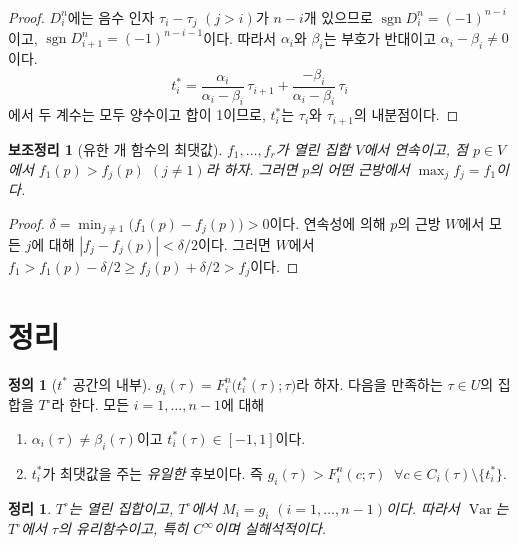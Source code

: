 \documentclass[11pt,a4paper]{article}
\newtheorem{theorem}{정리}
\newtheorem{lemma}{보조정리}
\theoremstyle{definition}
\newtheorem{definition}{정의}
\theoremstyle{remark}
\newcommand{\Var}{\operatorname{Var}}
\begin{document}
\begin{proof}
$D_i^n$에는 음수 인자 $\tau_i-\tau_j$ $(j>i)$가 $n-i$개 있으므로 $\operatorname{sgn}D_i^n=(-1)^{n-i}$이고, $\operatorname{sgn}D_{i+1}^n=(-1)^{n-i-1}$이다.
따라서 $\alpha_i$와 $\beta_i$는 부호가 반대이고 $\alpha_i-\beta_i\ne0$이다.
\[
t^*_i=\frac{\alpha_i}{\alpha_i-\beta_i}\,\tau_{i+1}+\frac{-\beta_i}{\alpha_i-\beta_i}\,\tau_i
\]
에서 두 계수는 모두 양수이고 합이 1이므로, $t^*_i$는 $\tau_i$와 $\tau_{i+1}$의 내분점이다.
\end{proof}

\begin{lemma}[유한 개 함수의 최댓값]\label{lem:max}
$f_1,\dots,f_r$가 열린 집합 $V$에서 연속이고, 점 $p\in V$에서 $f_1(p)>f_j(p)$ $(j\ne1)$라 하자.
그러면 $p$의 어떤 근방에서 $\max_j f_j=f_1$이다.
\end{lemma}

\begin{proof}
$\delta=\min_{j\ne1}\bigl(f_1(p)-f_j(p)\bigr)>0$이다.
연속성에 의해 $p$의 근방 $W$에서 모든 $j$에 대해 $|f_j-f_j(p)|<\delta/2$이다.
그러면 $W$에서 $f_1>f_1(p)-\delta/2\ge f_j(p)+\delta/2>f_j$이다.
\end{proof}

\section{정리}

\begin{definition}[$t^*$ 공간의 내부]
$g_i(\tau)=F_i^n\bigl(t^*_i(\tau);\tau\bigr)$라 하자. 다음을 만족하는 $\tau\in U$의 집합을 $T^\circ$라 한다.
모든 $i=1,\dots,n-1$에 대해
\begin{enumerate}[label=(\roman*)]
\item $\alpha_i(\tau)\ne\beta_i(\tau)$이고 $t^*_i(\tau)\in[-1,1]$이다.
\item $t^*_i$가 최댓값을 주는 \emph{유일한} 후보이다. 즉 $g_i(\tau)>F_i^n(c;\tau)$ $\ \forall c\in C_i(\tau)\setminus\{t^*_i\}$.
\end{enumerate}
\end{definition}

\begin{theorem}\label{thm:main}
$T^\circ$는 열린 집합이고, $T^\circ$에서 $M_i=g_i$ $(i=1,\dots,n-1)$이다.
따라서 $\Var$는 $T^\circ$에서 $\tau$의 유리함수이고, 특히 $C^\infty$이며 실해석적이다.
\end{theorem}
\end{document}
